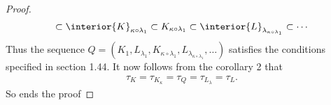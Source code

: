 \begin{proof}
\begin{align}
      \subset 
    \interior{K}_{\kappa\circ\lambda_1}
      \subset 
    K_{\kappa\circ\lambda_1}
      \subset
    \interior{L}_{\lambda_{\kappa\circ\lambda_1}}
      \subset
    \cdots
  \end{align}
%
Thus the sequence 
%
  $Q = (
    K_1, 
    L_{\lambda_1}, 
    K_{\kappa\circ\lambda_1}, 
    L_{\lambda_{\kappa\circ\lambda_1}},
    \dots
  )$
%
satisfies the conditions specified in section 1.44. 
It now follows from the corollary 2 that 
%
  \begin{align}  
    \tau_{K} 
    = 
      \tau_{K_\kappa} 
    = 
      \tau_{Q} 
    = 
      \tau_{L_\lambda} 
    = \tau_{L}.
  \end{align} 
%
So ends the proof
\end{proof}
